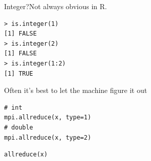 \begin{frame}[fragile]
  \begin{block}{Integer?\qquad Not always obvious in R.}
    \vspace{-.2cm}
    \begin{lstlisting}
> is.integer(1)
[1] FALSE
> is.integer(2)
[1] FALSE
> is.integer(1:2)
[1] TRUE
    \end{lstlisting}
  \end{block}
  \begin{block}{Often it's best to let the machine figure it out}\pause
    \begin{minipage}[t]{.475\textwidth}
      \begin{lstlisting}[title=Rmpi]
# int
mpi.allreduce(x, type=1)
# double
mpi.allreduce(x, type=2)
      \end{lstlisting}
    \end{minipage}
    \hfill
    \begin{minipage}[t]{.475\textwidth}
      \begin{lstlisting}[title=pbdMPI]
allreduce(x)
      \end{lstlisting}
    \end{minipage}
  \end{block}
\end{frame}









